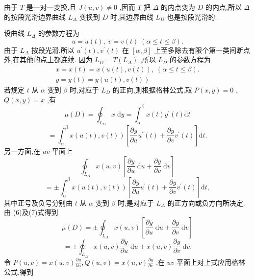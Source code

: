 由于 \(T\) 是一对一变换,且 \(J\left( {u,v}\right)  \neq  0\) ,因而 \(T\) 把 \(\Delta\) 的内点变为 \(D\) 的内点,所以 \(\Delta\) 的按段光滑边界曲线 \({L}_{\Delta }\) 变换到 \(D\) 时,其边界曲线 \({L}_{D}\) 也是按段光滑的.

设曲线 \({L}_{\Delta }\) 的参数方程为
\[
u = u\left( t\right) ,\;v = v\left( t\right) \;\left( {\alpha  \leq  t \leq  \beta }\right) .
\]
由于 \({L}_{\Delta }\) 按段光滑,所以 \({u}^{\prime }\left( t\right) ,{v}^{\prime }\left( t\right)\) 在 \(\left\lbrack  {\alpha ,\beta }\right\rbrack\) 上至多除去有限个第一类间断点外,在其他的点上都连续. 因为 \({L}_{D} = T\left( {L}_{\Delta }\right)\) ,所以 \({L}_{D}\) 的参数方程为
\[
\begin{array}{l} x = x\left( t\right)  = x\left( {u\left( t\right) ,v\left( t\right) }\right) ,\;\left( {\alpha  \leq  t \leq  \beta }\right) . \\  y = y\left( t\right)  = y\left( {u\left( t\right) ,v\left( t\right) }\right)  \end{array}
\]
若规定 \(t\) 从 \(\alpha\) 变到 \(\beta\) 时,对应于 \({L}_{D}\) 的正向,则根据格林公式,取 \(P\left( {x,y}\right)  = 0\) , \(Q\left( {x,y}\right)  = x\) ,有
\[
\mu \left( D\right)  = {\oint }_{{L}_{D}}x\mathrm{\;d}y = {\int }_{\alpha }^{\beta }x\left( t\right) {y}^{\prime }\left( t\right) \mathrm{d}t
\]
\[
= {\int }_{\alpha }^{\beta }x\left( {u\left( t\right) ,v\left( t\right) }\right) \left\lbrack  {\frac{\partial y}{\partial u}{u}^{\prime }\left( t\right)  + \frac{\partial y}{\partial v}{v}^{\prime }\left( t\right) }\right\rbrack  \mathrm{d}t. \tag{6}
\]
另一方面,在 \({uv}\) 平面上
\[
{\oint }_{{L}_{\Delta }}x\left( {u,v}\right) \left\lbrack  {\frac{\partial y}{\partial u}\mathrm{\;d}u + \frac{\partial y}{\partial v}\mathrm{\;d}v}\right\rbrack
\]
\[
=  \pm  {\int }_{\alpha }^{\beta }x\left( {u\left( t\right) ,v\left( t\right) }\right) \left\lbrack  {\frac{\partial y}{\partial u}{u}^{\prime }\left( t\right)  + \frac{\partial y}{\partial v}{v}^{\prime }\left( t\right) }\right\rbrack  \mathrm{d}t, \tag{7}
\]
其中正号及负号分别由 \(t\) 从 \(\alpha\) 变到 \(\beta\) 时,是对应于 \({L}_{\Delta }\) 的正方向或负方向所决定. 由 (6)及(7)式得到
\[
\mu \left( D\right)  =  \pm  {\oint }_{{L}_{\Delta }}x\left( {u,v}\right) \left\lbrack  {\frac{\partial y}{\partial u}\mathrm{\;d}u + \frac{\partial y}{\partial v}\mathrm{\;d}v}\right\rbrack
\]
\[
=  \pm  {\oint }_{{L}_{\Delta }}x\left( {u,v}\right) \frac{\partial y}{\partial u}\mathrm{\;d}u + x\left( {u,v}\right) \frac{\partial y}{\partial v}\mathrm{\;d}v.
\]
令 \(P\left( {u,v}\right)  = x\left( {u,v}\right) \frac{\partial y}{\partial u},Q\left( {u,v}\right)  = x\left( {u,v}\right) \frac{\partial y}{\partial v}\) ,在 \({uv}\) 平面上对上式应用格林公式,得到
